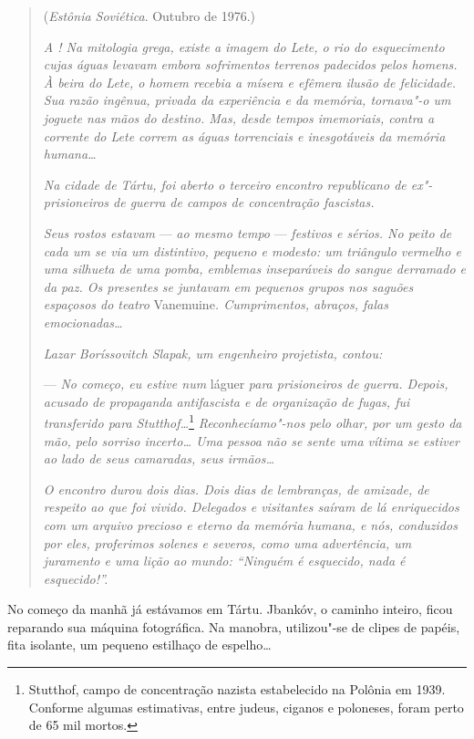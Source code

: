 \begin{quotation}
\begin{flushright}
(\emph{Estônia Soviética}. Outubro de 1976.)
\end{flushright}
\vspace{4pt}
\noindent\emph{A ! Na mitologia grega, existe a imagem
do Lete, o rio do esquecimento cujas águas levavam embora sofrimentos
terrenos padecidos pelos homens. À beira do Lete, o homem recebia a
mísera e efêmera ilusão de felicidade. Sua razão ingênua, privada da
experiência e da memória, tornava"-o um joguete nas mãos do destino. Mas,
desde tempos imemoriais, contra a corrente do Lete correm as águas
torrenciais e inesgotáveis da memória humana\ldots{}}

\emph{Na cidade de Tártu, foi aberto o terceiro encontro republicano de
ex"-prisioneiros de guerra de campos de concentração fascistas.}

\emph{Seus rostos estavam} --- \emph{ao mesmo tempo} --- \emph{festivos
e sérios. No peito de cada um se via um distintivo, pequeno e modesto:
um triângulo vermelho e uma silhueta de uma pomba, emblemas inseparáveis
do sangue derramado e da paz. Os presentes se juntavam em pequenos
grupos nos saguões espaçosos do teatro} Vanemuine\emph{. Cumprimentos,
abraços, falas emocionadas\ldots{}}

\emph{Lazar Boríssovitch Slapak, um engenheiro projetista, contou:}

--- \emph{No começo, eu estive num} láguer \emph{para prisioneiros de
guerra. Depois, acusado de propaganda antifascista e de organização de
fugas, fui transferido para Stutthof\ldots{}}\footnote{Stutthof, campo
  de concentração nazista estabelecido na Polônia em 1939. Conforme
  algumas estimativas, entre judeus, ciganos e poloneses, foram perto de
  65 mil mortos.} \emph{Reconhecíamo"-nos pelo olhar, por um gesto da
mão, pelo sorriso incerto\ldots{} Uma pessoa não se sente uma vítima se
estiver ao lado de seus camaradas, seus irmãos\ldots{}}

\emph{O encontro durou dois dias. Dois dias de lembranças, de amizade,
de respeito ao que foi vivido. Delegados e visitantes saíram de lá
enriquecidos com um arquivo precioso e eterno da memória humana, e nós,
conduzidos por eles, proferimos solenes e severos, como uma advertência,
um juramento e uma lição ao mundo: ``Ninguém é esquecido, nada é
esquecido!''.}
\end{quotation}

No começo da manhã já estávamos em Tártu. Jbankóv, o caminho inteiro,
ficou reparando sua máquina fotográfica. Na manobra, utilizou"-se de
clipes de papéis, fita isolante, um pequeno estilhaço de espelho\ldots{}

